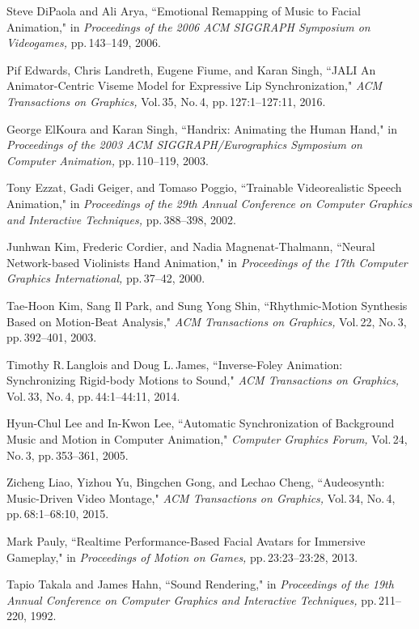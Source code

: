 \begin{thebibliography}{55}
Steve DiPaola and Ali Arya,
 ``Emotional Remapping of Music to Facial Animation,"
 in \textit{Proceedings of the 2006 ACM SIGGRAPH Symposium on Videogames,} pp.\,143--149, 2006.
 
Pif Edwards, Chris Landreth, Eugene Fiume, and Karan Singh,
 ``JALI An Animator-Centric Viseme Model for Expressive Lip Synchronization,"
 \textit{ACM Transactions on Graphics,} Vol.\,35, No.\,4, pp.\,127:1--127:11, 2016.

George ElKoura and Karan Singh,
 ``Handrix: Animating the Human Hand,"
 in \textit{Proceedings of the 2003 ACM SIGGRAPH/Eurographics Symposium on Computer Animation,} pp.\,110--119, 2003.

Tony Ezzat, Gadi Geiger, and Tomaso Poggio,
 ``Trainable Videorealistic Speech Animation,"
 in \textit{Proceedings of the 29th Annual Conference on Computer Graphics and Interactive Techniques,} pp.\,388--398, 2002.

Junhwan Kim, Frederic Cordier, and Nadia Magnenat-Thalmann,
 ``Neural Network-based Violinists Hand Animation,"
 in \textit{Proceedings of the 17th Computer Graphics International,} pp.\,37--42, 2000.

Tae-Hoon Kim, Sang Il Park, and Sung Yong Shin,
 ``Rhythmic-Motion Synthesis Based on Motion-Beat Analysis,"
 \textit{ACM Transactions on Graphics,} Vol.\,22, No.\,3, pp.\,392--401, 2003.

Timothy R.\,Langlois and Doug L.\,James,
 ``Inverse-Foley Animation: Synchronizing Rigid-body Motions to Sound,"
 \textit{ACM Transactions on Graphics,} Vol.\,33, No.\,4, pp.\,44:1--44:11, 2014.

Hyun-Chul Lee and In-Kwon Lee,
 ``Automatic Synchronization of Background Music and Motion in Computer Animation,"
 \textit{Computer Graphics Forum,} Vol.\,24, No.\,3, pp.\,353--361, 2005.

Zicheng Liao, Yizhou Yu, Bingchen Gong, and Lechao Cheng,
 ``Audeosynth: Music-Driven Video Montage,"
 \textit{ACM Transactions on Graphics,} Vol.\,34, No.\,4, pp.\,68:1--68:10, 2015.
 
Mark Pauly,
 ``Realtime Performance-Based Facial Avatars for Immersive Gameplay,"
 in \textit{Proceedings of Motion on Games,} pp.\,23:23--23:28, 2013.
 
Tapio Takala and James Hahn,
 ``Sound Rendering,"
 in \textit{Proceedings of the 19th Annual Conference on Computer Graphics and Interactive Techniques,} pp.\,211--220, 1992.


\end{thebibliography}
